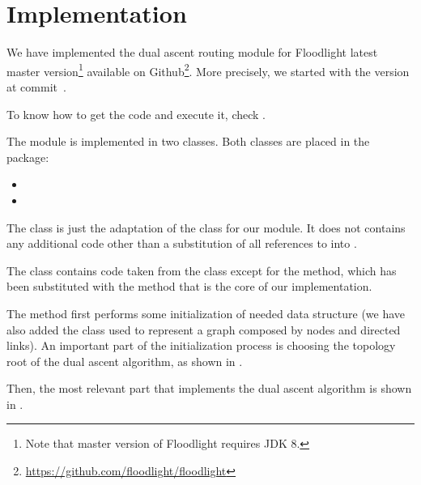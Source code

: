 \chapter{Implementation}\label{ch:implementation}

We have implemented the dual ascent routing module for Floodlight latest master
version\footnote{Note that master version of Floodlight requires JDK 8.}
available on Github\footnote{\url{https://github.com/floodlight/floodlight}}.
More precisely, we started with the version at
commit~\href{https://github.com/floodlight/floodlight/tree/d737cb05656a6038f4e2277ffb4503d45b7b29cb}{}.

To know how to get the code and execute it, check
.

The module is implemented in two classes. Both classes are placed in the
 package:
\begin{itemize}
	\item {}
	\item {}
\end{itemize}

The  class is just the adaptation of the
 class for our module. It does not contains any additional
code other than a substitution of all references to  into
.

The  class contains code taken from the
 class except for the  method, which has
been substituted with the  method that is the core of our
implementation.

The  method first performs some initialization of needed data
structure (we have also added the  class used to represent a graph
composed by nodes and directed links). An important part of the initialization
process is choosing the topology root of the dual ascent algorithm, as shown in
.



Then, the most relevant part that implements the dual ascent algorithm is shown
in .



